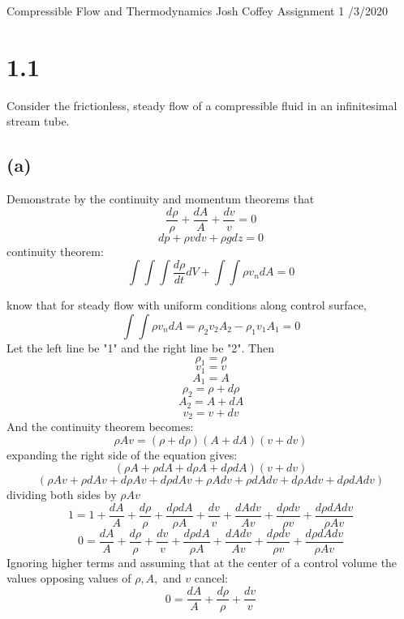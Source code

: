 \documentclass[preview,12pt]{article}
\begin{document}
\noindent Compressible Flow and Thermodynamics\newline
Josh Coffey \newline
Assignment 1 /3/2020 \newline

\section*{1.1}
    Consider the frictionless, steady flow of a compressible fluid in an infinitesimal stream tube.
    \subsection*{(a)} 
    Demonstrate by the continuity and momentum theorems that
    $$\frac{d\rho}{\rho}+\frac{dA}{A}+\frac{dv}{v}=0$$
    $$dp+\rho v dv+\rho g dz=0$$
    continuity theorem:
    $$\int\int\int\frac{d\rho}{dt}dV+\int\int \rho v_ndA=0$$
    
    know that for steady flow with uniform conditions along control surface, 
    $$\int\int\rho v_ndA=\rho_2v_2A_2-\rho_1v_1A_1=0$$
    Let the left line be "1" and the right line be "2".  Then
    $$\rho_1=\rho$$
    $$v_1=v$$
    $$A_1=A$$
    $$\rho_2=\rho+d\rho$$
    $$A_2=A+dA$$
    $$v_2=v+dv$$
    And the continuity theorem becomes:
    $$\rho A v=(\rho+d\rho)(A+dA)(v+dv)$$
    expanding the right side of the equation gives:
    $$(\rho A + \rho dA+d\rho A+d\rho dA)(v+dv)$$
    $$(\rho Av+\rho dA v+d\rho A v+d\rho dA v+\rho A dv+\rho dA dv+d\rho A dv+d\rho dAdv)$$
    dividing both sides by $\rho Av$
    $$1=1+\frac{dA}{A}+\frac{d\rho}{\rho}+\frac{d\rho dA}{\rho A}+\frac{dv}{v}+\frac{dAdv}{Av}+\frac{d\rho dv}{\rho v}+\frac{d\rho dAdv}{\rho A v}$$
    $$0=\frac{dA}{A}+\frac{d\rho}{\rho}+\frac{dv}{v}+\frac{d\rho dA}{\rho A}+\frac{dAdv}{Av}+\frac{d\rho dv}{\rho v}+\frac{d\rho dAdv}{\rho A v}$$
    Ignoring higher terms and assuming that at the center of a control volume the values opposing values of $\rho, A,$ and $v$ cancel:
    $$0=\frac{dA}{A}+\frac{d\rho}{\rho}+\frac{dv}{v}$$
    
\end{document}
